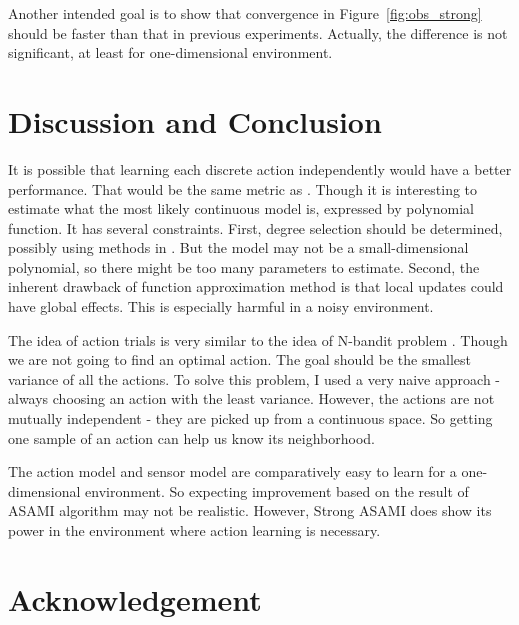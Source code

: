 \documentclass[10pt]{article}
\begin{document}
Another intended goal is to show that convergence in
Figure~\ref{fig:obs_strong} should be faster than that in previous
experiments. Actually, the difference is not significant, at least for
one-dimensional environment.

\section{Discussion and Conclusion}
\label{sec:dis}

It is possible that learning each discrete action independently would
have a better performance. That would be the same metric as
\cite{LNAI2007-ahmadi}. Though it is interesting to estimate what
the most likely continuous model is, expressed by polynomial function.
It has several constraints. First, degree selection should be
determined, possibly using methods in \cite{IJAIT08-stronger}. But the
model may not be a small-dimensional polynomial, so there might be
too many parameters to estimate. Second, the inherent drawback of
function approximation method is that local updates could have global
effects. This is especially harmful in a noisy environment.

The idea of action trials is very similar to the idea of N-bandit
problem \cite{vermorel2005multi}. Though we are not going to find an
optimal action. The goal should be the smallest variance of all the
actions. To solve this problem, I used a very naive approach - always
choosing an action with the least variance. However, the actions are
not mutually independent - they are picked up from a continuous space.
So getting one sample of an action can help us know its neighborhood.

The action model and sensor model are comparatively easy to learn for
a one-dimensional environment. So expecting improvement based on the
result of ASAMI algorithm may not be realistic. However, Strong ASAMI
does show its power in the environment where action learning is
necessary.

\section{Acknowledgement}




\end{document}
